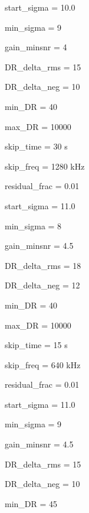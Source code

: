 \documentclass[letterpaper,10pt,english]{sphinxmanual}
\begin{document}
\sphinxAtStartPar
start\_sigma             =       10.0

\sphinxAtStartPar
min\_sigma               =       9

\sphinxAtStartPar
gain\_minsnr             =       4

\sphinxAtStartPar
DR\_delta\_rms    =       15

\sphinxAtStartPar
DR\_delta\_neg    =       10

\sphinxAtStartPar
min\_DR                  =       40

\sphinxAtStartPar
max\_DR                  =       10000

\sphinxAtStartPar
skip\_time               =       30 s

\sphinxAtStartPar
skip\_freq               =       1280 kHz

\sphinxAtStartPar
{}

\sphinxAtStartPar
residual\_frac   =       0.01

\sphinxAtStartPar
start\_sigma             =       11.0

\sphinxAtStartPar
min\_sigma               =       8

\sphinxAtStartPar
gain\_minsnr             =       4.5

\sphinxAtStartPar
DR\_delta\_rms    =       18

\sphinxAtStartPar
DR\_delta\_neg    =       12

\sphinxAtStartPar
min\_DR                  =       40

\sphinxAtStartPar
max\_DR                  =       10000

\sphinxAtStartPar
skip\_time               =       15 s

\sphinxAtStartPar
skip\_freq               =       640 kHz

\sphinxAtStartPar
{}

\sphinxAtStartPar
residual\_frac   =   0.01

\sphinxAtStartPar
start\_sigma             =       11.0

\sphinxAtStartPar
min\_sigma               =       9

\sphinxAtStartPar
gain\_minsnr             =       4.5

\sphinxAtStartPar
DR\_delta\_rms    =       15

\sphinxAtStartPar
DR\_delta\_neg    =       10

\sphinxAtStartPar
min\_DR                  =       45
\end{document}
